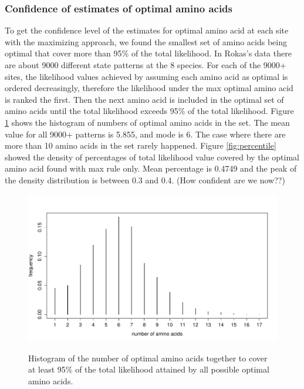 \documentclass[13pt]{article}
\begin{document}
\subsubsection{Confidence of estimates of optimal amino acids}
To get the confidence level of the estimates for optimal amino acid at each site with the maximizing approach, we found the smallest set of amino acids being optimal that cover more than 95\% of the total likelihood.
In Rokas's data there are about 9000 different state patterns at the 8 species.
For each of the 9000+ sites, the likelihood values achieved by assuming each amino acid as optimal is ordered decreasingly, therefore the likelihood under the max optimal amino acid is ranked the first.
Then the next amino acid is included in the optimal set of amino acids until the total likelihood exceeds 95\% of the total likelihood.
Figure \ref{fig:AAnum} shows the histogram of numbers of optimal amino acids in the set.
The mean value for all 9000+ patterns is 5.855, and mode is 6.
The case where there are more than 10 amino acids in the set rarely happened.
Figure \ref{fig:percentile} showed the density of percentages of total likelihood value covered by the optimal amino acid found with max rule only.
Mean percentage is 0.4749 and the peak of the density distribution is between 0.3 and 0.4. (How confident are we now??)

\begin{figure}[h]
\caption{Histogram of the number of optimal amino acids together to cover at least 95\% of the total likelihood attained by all possible optimal amino acids.}
\centering
\includegraphics[width=\textwidth]{AAnum.pdf}
\label{fig:AAnum}
\end{figure}
\end{document}
